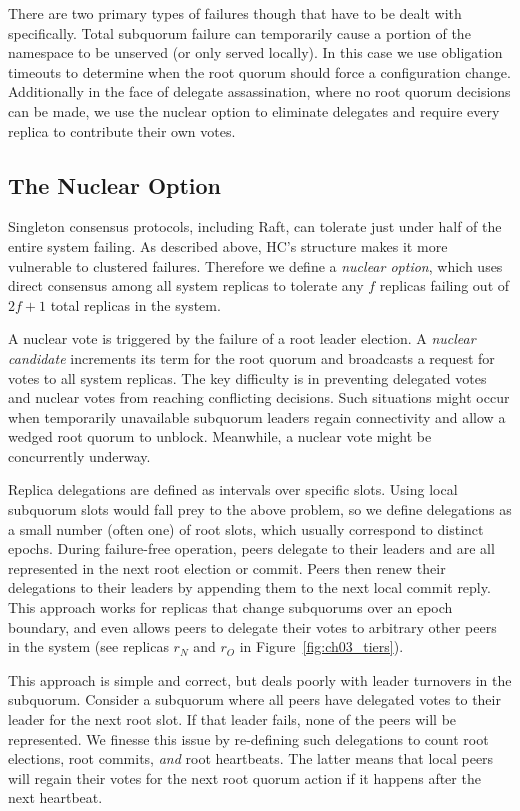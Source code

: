 There are two primary types of failures though that have to be dealt with specifically.
Total subquorum failure can temporarily cause a portion of the namespace to be unserved (or only served locally).
In this case we use obligation timeouts to determine when the root quorum should force a configuration change.
Additionally in the face of delegate assassination, where no root quorum decisions can be made, we use the nuclear option to eliminate delegates and require every replica to contribute their own votes.

\subsection{The Nuclear Option}
\label{ch03_nuclear_option}

Singleton consensus protocols, including Raft, can tolerate just under half of the entire system failing.
As described above, HC's structure makes it more vulnerable to clustered failures.
Therefore we define a \emph{nuclear option}, which uses direct consensus among all system replicas to tolerate any $f$ replicas failing out of $2f+1$ total replicas in the system.

A nuclear vote is triggered by the failure of a root leader election.
A \emph{nuclear candidate} increments its term for the root quorum and broadcasts a request for votes to all system replicas.
The key difficulty is in preventing delegated votes and nuclear votes from reaching conflicting decisions.
Such situations might occur when temporarily unavailable subquorum leaders regain connectivity and allow a wedged root quorum to unblock.
Meanwhile, a nuclear vote might be concurrently underway.

Replica delegations are defined as intervals over specific slots.
Using local subquorum slots would fall prey to the above problem, so we define delegations as a small number (often one) of root slots, which usually correspond to distinct epochs.
During failure-free operation, peers delegate to their leaders and are all represented in the next root election or commit.
Peers then renew their delegations to their leaders by appending them to the next local commit reply.
This approach works for replicas that change subquorums over an epoch boundary, and even allows peers to delegate their votes to arbitrary other peers in the system (see replicas $r_N$ and $r_O$ in Figure~\ref{fig:ch03_tiers}).

This approach is simple and correct, but deals poorly with leader turnovers in the subquorum.
Consider a subquorum where all peers have delegated votes to their leader for the next root slot.
If that leader fails, none of the peers will be represented.
We finesse this issue by re-defining such delegations to count root elections, root commits, \emph{and} root heartbeats.
The latter means that local peers will regain their votes for the next root quorum action if it happens after the next heartbeat.

